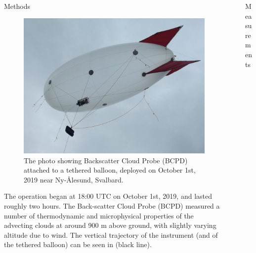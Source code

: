 \documentclass[final]{beamer}
\newlength{\sepwidth}
\newlength{\colwidth}
\newcommand{\separatorcolumn}{\begin{column}{\sepwidth}\end{column}}
\begin{document}
\begin{frame}[t]
\begin{columns}[t]
\begin{column}{\colwidth}
\begin{block}{Methods}
        \begin{figure}
          \centering
          \includegraphics[width=0.8\colwidth]{img/balloon.png}
          \caption{The photo showing Backscatter Cloud Probe (BCPD) attached to a tethered balloon, deployed on October 1st, 2019 near Ny-\r{A}lesund, Svalbard.}
          \label{fig:01}
        \end{figure}

        The operation began at 18:00 UTC on October 1st, 2019, and lasted roughly two hours. The Back-scatter Cloud Probe (BCPD) measured a number of thermodynamic and microphysical properties of the advecting clouds at around 900 m above ground, with slightly varying altitude due to wind. The vertical trajectory of the instrument (and of the tethered balloon) can be seen in  (black line).
      \end{block}

    \end{column}
    \separatorcolumn

    \begin{column}{\colwidth}

      \begin{block}{Measurements}


\end{block}
\end{column}
\end{columns}
\end{frame}
\end{document}
